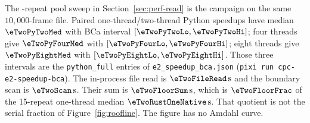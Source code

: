 The \eTwoNScale-repeat pool sweep in Section~\ref{sec:perf-read} is the campaign on the same \(10{,}000\)-frame file.
Paired one-thread/two-thread Python speedups have median \(\eTwoPyTwoMed\) with BCa interval \([\eTwoPyTwoLo, \eTwoPyTwoHi]\);
four threads give \(\eTwoPyFourMed\) with \([\eTwoPyFourLo, \eTwoPyFourHi]\);
eight threads give \(\eTwoPyEightMed\) with \([\eTwoPyEightLo, \eTwoPyEightHi]\).
Those three intervals are the \texttt{python\_full} entries of \texttt{e2\_speedup\_bca.json} (\texttt{pixi run cpc-e2-speedup-bca}).
The in-process file read is \(\eTwoFileRead\,\mathrm{s}\) and the boundary scan is \(\eTwoScan\,\mathrm{s}\).
Their sum is \(\eTwoFloorSum\,\mathrm{s}\), which is \(\eTwoFloorFrac\) of the 15-repeat one-thread median \(\eTwoRustOneNative\,\mathrm{s}\).
That quotient is not the serial fraction of Figure~\ref{fig:roofline}.
The figure has no Amdahl curve.

